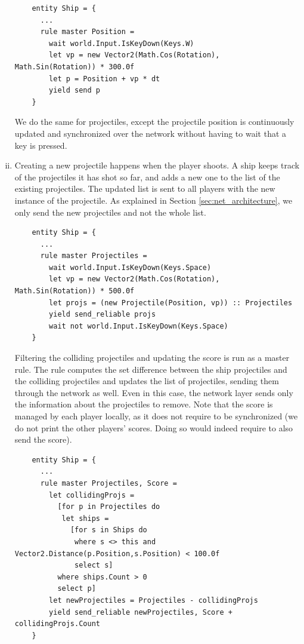 \begin{enumerate}[(i)]
	\begin{lstlisting}
	entity Ship = {
	  ...
	  rule master Position =
	    wait world.Input.IsKeyDown(Keys.W)
	    let vp = new Vector2(Math.Cos(Rotation), Math.Sin(Rotation)) * 300.0f
	    let p = Position + vp * dt
	    yield send p
	}
	\end{lstlisting}
	
	We do the same for projectiles, except the projectile position is continuously updated and synchronized over the network without having to wait that a key is pressed.
	
	\item Creating a new projectile happens when the player shoots. A ship keeps track of the projectiles it has shot so far, and adds a new one to the list of the existing projectiles. The updated list is sent to all players with the new instance of the projectile. As explained in Section \ref{sec:net_architecture}, we only send the new projectiles and not the whole list.
	
	\begin{lstlisting}
	entity Ship = {
	  ...
	  rule master Projectiles =
	    wait world.Input.IsKeyDown(Keys.Space)
	    let vp = new Vector2(Math.Cos(Rotation), Math.Sin(Rotation)) * 500.0f
	    let projs = (new Projectile(Position, vp)) :: Projectiles
	    yield send_reliable projs
	    wait not world.Input.IsKeyDown(Keys.Space)
	}
	\end{lstlisting}
	
	Filtering the colliding projectiles and updating the score is run as a master rule. The rule computes the set difference between the ship projectiles and the colliding projectiles and updates the list of projectiles, sending them through the network as well. Even in this case, the network layer sends only the information about the projectiles to remove. Note that the score is managed by each player locally, as it does not require to be synchronized (we do not print the other players' scores. Doing so would indeed require to also send the score).
	
	\begin{lstlisting}
	entity Ship = {
	  ...
	  rule master Projectiles, Score =
	    let collidingProjs =
	      [for p in Projectiles do
	       let ships =
	         [for s in Ships do
	          where s <> this and Vector2.Distance(p.Position,s.Position) < 100.0f
	          select s]
	      where ships.Count > 0
	      select p]
	    let newProjectiles = Projectiles - collidingProjs
	    yield send_reliable newProjectiles, Score + collidingProjs.Count 
	}
	\end{lstlisting}
\end{enumerate}

